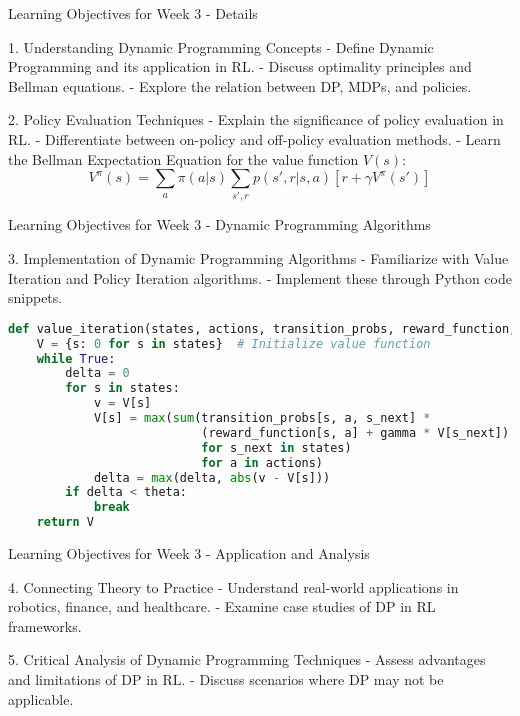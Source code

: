 \documentclass[aspectratio=169]{beamer}
\begin{document}
\begin{frame}{Learning Objectives for Week 3 - Details}
    \begin{block}{1. Understanding Dynamic Programming Concepts}
        - Define Dynamic Programming and its application in RL.
        - Discuss optimality principles and Bellman equations.
        - Explore the relation between DP, MDPs, and policies.
    \end{block}
    
    \begin{block}{2. Policy Evaluation Techniques}
        - Explain the significance of policy evaluation in RL.
        - Differentiate between on-policy and off-policy evaluation methods.
        - Learn the Bellman Expectation Equation for the value function \( V(s) \):
        \begin{equation}
            V^\pi(s) = \sum_{a} \pi(a|s) \sum_{s', r} p(s', r|s, a) [r + \gamma V^\pi(s')]
        \end{equation}
    \end{block}
\end{frame}

\begin{frame}[fragile]{Learning Objectives for Week 3 - Dynamic Programming Algorithms}
    \begin{block}{3. Implementation of Dynamic Programming Algorithms}
        - Familiarize with Value Iteration and Policy Iteration algorithms.
        - Implement these through Python code snippets.
    \end{block}
    
    \begin{lstlisting}[language=Python]
def value_iteration(states, actions, transition_probs, reward_function, gamma, theta=1e-6):
    V = {s: 0 for s in states}  # Initialize value function
    while True:
        delta = 0
        for s in states:
            v = V[s]
            V[s] = max(sum(transition_probs[s, a, s_next] * 
                           (reward_function[s, a] + gamma * V[s_next]) 
                           for s_next in states) 
                           for a in actions)
            delta = max(delta, abs(v - V[s]))
        if delta < theta:
            break
    return V
    \end{lstlisting}
\end{frame}

\begin{frame}{Learning Objectives for Week 3 - Application and Analysis}
    \begin{block}{4. Connecting Theory to Practice}
        - Understand real-world applications in robotics, finance, and healthcare.
        - Examine case studies of DP in RL frameworks.
    \end{block}
    
    \begin{block}{5. Critical Analysis of Dynamic Programming Techniques}
        - Assess advantages and limitations of DP in RL.
        - Discuss scenarios where DP may not be applicable.
    \end{block}
\end{frame}
\end{document}
